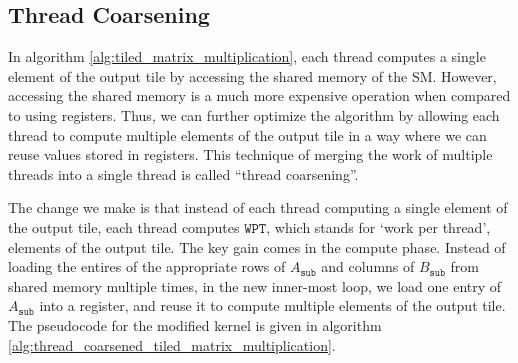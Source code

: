 \documentclass{article}
\begin{document}
\vspace{0.2in}
\subsection{Thread Coarsening}
In algorithm \ref{alg:tiled_matrix_multiplication}, each thread computes a single element of the output tile by accessing the shared memory of the SM. However, accessing the shared memory is a much more expensive operation when compared to using registers. Thus, we can further optimize the algorithm by allowing each thread to compute multiple elements of the output tile in a way where we can reuse values stored in registers. This technique of merging the work of multiple threads into a single thread is called ``thread coarsening''.

The change we make is that instead of each thread computing a single element of the output tile, each thread computes $\texttt{WPT}$, which stands for `work per thread', elements of the output tile. The key gain comes in the compute phase. Instead of loading the entires of the appropriate rows of $A_{\texttt{sub}}$ and columns of $B_{\texttt{sub}}$ from shared memory multiple times, in the new inner-most loop, we load one entry of $A_{\texttt{sub}}$ into a register, and reuse it to compute multiple elements of the output tile. The pseudocode for the modified kernel is given in algorithm \ref{alg:thread_coarsened_tiled_matrix_multiplication}.
\end{document}
